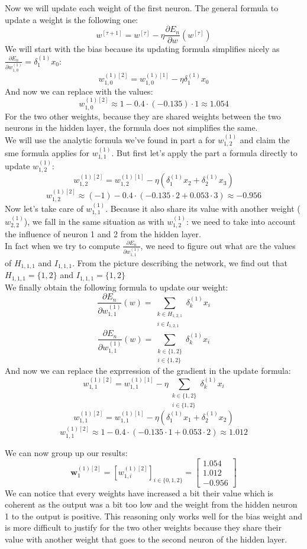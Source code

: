 \documentclass[a4paper, 10pt]{article}
\begin{document}
Now we will update each weight of the first neuron. The general formula to update a weight is the following one:
$$
w^{[\tau +1]} = w^{[\tau]} - \eta \frac{\partial E_n}{\partial w}(w^{[\tau]})
$$
We will start with the bias because its updating formula simplifies nicely as $\frac{\partial E_n}{\partial w_{1,0}^{(1)}}=\delta_1^{(1)}x_0$:
$$
w_{1,0}^{(1)[2]} = w_{1,0}^{(1)[1]} - \eta \delta_1^{(1)}x_0
$$
And now we can replace with the values:
$$
w_{1,0}^{(1)[2]} \approx 1 - 0.4\cdot(-0.135)\cdot1 \approx 1.054
$$
For the two other weights, because they are shared weights between the two neurons in the hidden layer,
the formula does not simplifies the same.
\\
We will use the analytic formula we've found in part a for $w_{1,2}^{(1)}$ and claim the sme formula applies for
$w_{1,1}^{(1)}$. But first let's apply the part a formula directly to update $w_{1,2}^{(1)}$:
$$
w_{1,2}^{(1)[2]} = w_{1,2}^{(1)[1]} - \eta (\delta_1^{(1)}x_2 + \delta_2^{(1)}x_3)
$$
$$
w_{1,2}^{(1)[2]} \approx (-1) - 0.4\cdot(-0.135\cdot2+0.053\cdot3) \approx -0.956
$$
Now let's take care of $w_{1,1}^{(1)}$. Because it also share its value with another weight ($w_{2,2}^{(1)}$), 
we fall in the same situation as with $w_{1,2}^{(1)}$: we need to take into account the influence of neuron 1 and 2 from the hidden layer.  
\\
In fact when we try to compute $\frac{\partial E_n}{\partial w_{1,1}^{(1)}}$, we need to figure out what are the values of 
$H_{1,1,1}$ and $I_{1,1,1}$.
From the picture describing the network, we find out that $H_{1,1,1} = \{1,2\}$ and $I_{1,1,1} = \{1,2\}$
\\
We finally obtain the following formula to update our weight:
$$
\frac{\partial E_n}{\partial w_{1,1}^{(1)}}(w) = \sum_{\substack{k\in H_{1,2,1}\\i\in I_{1,2,1}}} \delta_k^{(1)}x_i 
$$
$$
\frac{\partial E_n}{\partial w_{1,1}^{(1)}}(w) = \sum_{\substack{k\in \{1,2\}\\i\in \{1,2\}}} \delta_k^{(1)}x_i 
$$
And now we can replace the exprression of the gradient in the update formula:
$$
w_{1,1}^{(1)[2]} = w_{1,1}^{(1)[1]} - \eta \sum_{\substack{k\in \{1,2\}\\i\in \{1,2\}}} \delta_k^{(1)}x_i 
$$
$$
w_{1,1}^{(1)[2]} = w_{1,1}^{(1)[1]} - \eta (\delta_1^{(1)}x_1 + \delta_2^{(1)}x_2) 
$$
$$
w_{1,1}^{(1)[2]} \approx 1 - 0.4\cdot(-0.135\cdot1 + 0.053\cdot2)\approx 1.012
$$

We can now group up our results:
$$
\bm{w}_1^{(1)[2]} = [w_{1,i}^{(1)[2]}]_{i\in\{0,1,2\}} = \begin{bmatrix}
    1.054\\
    1.012\\
    -0.956
\end{bmatrix}
$$
We can notice that every weights have increased a bit their value which is coherent as the output was a bit too
low and the weight from the hidden neuron 1 to the output is positive. This reasoning only works well for the bias 
weight and is more difficult to justify for the two other weights because they share their value with another weight 
that goes to the second neuron of the hidden layer.
\end{document}
